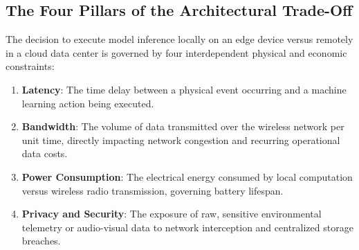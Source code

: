 \subsection{The Four Pillars of the Architectural Trade-Off}\label{subsec:four_pillars}

\begin{keyidea}
The decision to execute model inference locally on an edge device versus remotely in a cloud data center is governed by four interdependent physical and economic constraints:
\begin{enumerate}
    \item \textbf{Latency}: The time delay between a physical event occurring and a machine learning action being executed.
    \item \textbf{Bandwidth}: The volume of data transmitted over the wireless network per unit time, directly impacting network congestion and recurring operational data costs.
    \item \textbf{Power Consumption}: The electrical energy consumed by local computation versus wireless radio transmission, governing battery lifespan.
    \item \textbf{Privacy and Security}: The exposure of raw, sensitive environmental telemetry or audio-visual data to network interception and centralized storage breaches.
\end{enumerate}
\end{keyidea}

